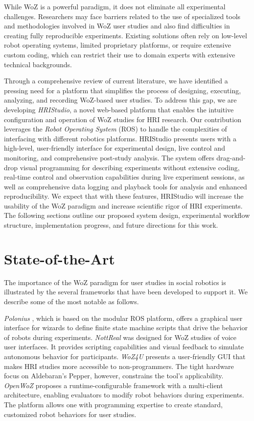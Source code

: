 \documentclass[letterpaper, 10 pt, conference]{ieeeconf}
\begin{document}
While WoZ is a powerful paradigm, it does not eliminate all experimental challenges. Researchers may face barriers related to the use of specialized tools and methodologies involved in WoZ user studies and also find difficulties in creating fully reproducible experiments. Existing solutions often rely on low-level robot operating systems, limited proprietary platforms, or require extensive custom coding, which can restrict their use to domain experts with extensive technical backgrounds.

Through a comprehensive review of current literature, we have identified a pressing need for a platform that simplifies the process of designing, executing, analyzing, and recording WoZ-based user studies. To address this gap, we are developing \emph{HRIStudio},  a novel web-based platform that enables the intuitive configuration and operation of WoZ studies for HRI research. Our contribution leverages the \emph{Robot Operating System} (ROS) to handle the complexities of interfacing with different robotics platforms. HRIStudio presents users with a high-level, user-friendly interface for experimental design, live control and monitoring, and comprehensive post-study analysis. The system offers drag-and-drop visual programming for describing experiments without extensive coding, real-time control and observation capabilities during live experiment sessions, as well as comprehensive data logging and playback tools for analysis and enhanced reproducibility. We expect that with these features, HRIStudio will increase the usability of the  WoZ paradigm and increase scientific rigor of HRI experiments. The following sections outline our proposed system design, experimental workflow structure, implementation progress, and future directions for this work.

\section{State-of-the-Art}

The importance of the WoZ paradigm for user studies in social robotics is illustrated by the several frameworks that have been developed to support it. We describe some of the most notable as follows.

\emph{Polonius}  \cite{Lu2011}, which is based on the modular ROS platform, offers a graphical user interface for wizards to define finite state machine scripts that drive the behavior of robots during experiments. \emph{NottReal} \cite{Porcheron2020} was designed for WoZ studies of voice user interfaces. It provides scripting capabilities and visual feedback to simulate autonomous behavior for participants. \emph{WoZ4U}  \cite{Rietz2021} presents a user-friendly GUI that makes HRI studies more accessible to non-programmers. The tight hardware focus on Aldebaran's Pepper, however, constrains the tool's applicability. \emph{OpenWoZ} \cite{Hoffman2016} proposes a runtime-configurable framework with a multi-client architecture, enabling evaluators to modify robot behaviors during experiments. The platform allows one with programming expertise to create standard, customized robot behaviors for user studies.
\end{document}
